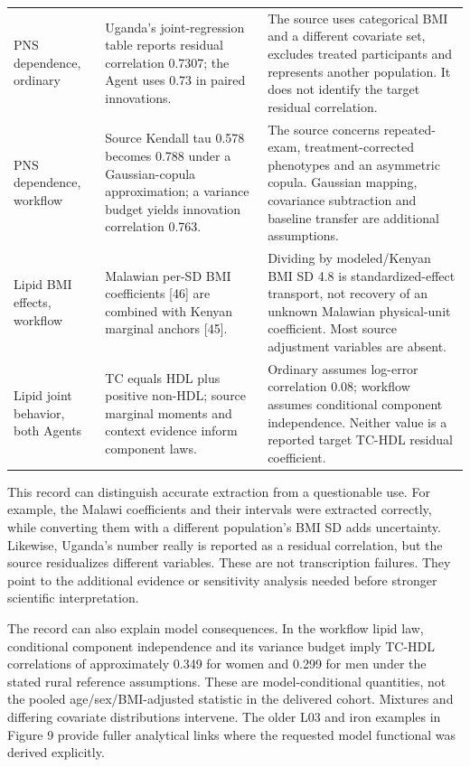 \documentclass[11pt,letterpaper]{article}
\begin{document}
\begin{xltabular}{\linewidth}{@{}>{\raggedright\arraybackslash}X>{\raggedright\arraybackslash}X>{\raggedright\arraybackslash}X@{}}
PNS dependence, ordinary & Uganda's joint-regression table reports residual correlation 0.7307; the Agent uses 0.73 in paired innovations. & The source uses categorical BMI and a different covariate set, excludes treated participants and represents another population. It does not identify the target residual correlation. \\

PNS dependence, workflow & Source Kendall tau 0.578 becomes 0.788 under a Gaussian-copula approximation; a variance budget yields innovation correlation 0.763. & The source concerns repeated-exam, treatment-corrected phenotypes and an asymmetric copula. Gaussian mapping, covariance subtraction and baseline transfer are additional assumptions. \\

Lipid BMI effects, workflow & Malawian per-SD BMI coefficients [46] are combined with Kenyan marginal anchors [45]. & Dividing by modeled/\allowbreak{}Kenyan BMI SD 4.8 is standardized-effect transport, not recovery of an unknown Malawian physical-unit coefficient. Most source adjustment variables are absent. \\

Lipid joint behavior, both Agents & TC equals HDL plus positive non-HDL; source marginal moments and context evidence inform component laws. & Ordinary assumes log-error correlation 0.08; workflow assumes conditional component independence. Neither value is a reported target TC-HDL residual coefficient. \\

\end{xltabular}

\endgroup

This record can distinguish accurate extraction from a questionable use. For example, the Malawi coefficients and their intervals were extracted correctly, while converting them with a different population's BMI SD adds uncertainty. Likewise, Uganda's number really is reported as a residual correlation, but the source residualizes different variables. These are not transcription failures. They point to the additional evidence or sensitivity analysis needed before stronger scientific interpretation.


The record can also explain model consequences. In the workflow lipid law, conditional component independence and its variance budget imply TC-HDL correlations of approximately 0.349 for women and 0.299 for men under the stated rural reference assumptions. These are model-conditional quantities, not the pooled age/\allowbreak{}sex/\allowbreak{}BMI-adjusted statistic in the delivered cohort. Mixtures and differing covariate distributions intervene. The older L03 and iron examples in Figure 9 provide fuller analytical links where the requested model functional was derived explicitly.
\end{document}
